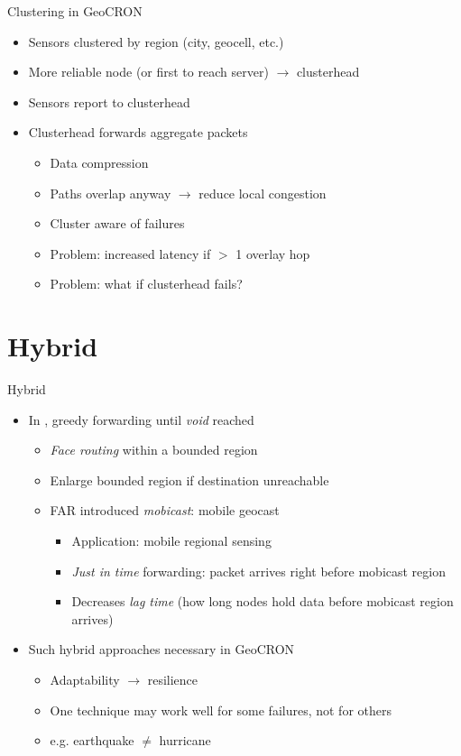 \documentclass[pdftex]{beamer}
\begin{document}
\begin{frame}{Clustering in GeoCRON}
	\begin{itemize}
	\item Sensors clustered by region (city, geocell, etc.)
	\item More reliable node (or first to reach server) $\rightarrow$ clusterhead
	\item Sensors report to clusterhead
	\item Clusterhead forwards aggregate packets
	\begin{itemize}
		\item Data compression
		\item Paths overlap anyway $\rightarrow$ reduce local congestion
		\item Cluster aware of failures
		\item<2-> \alert{Problem:} increased latency if $>$ 1 overlay hop
		\item<3-> \alert{Problem:} what if clusterhead fails?
	\end{itemize}
	\end{itemize}
\end{frame}


\section{Hybrid}

\begin{frame}{Hybrid}
\begin{itemize}
	\item In \cite{Kuhn2003, Huang2005, Karp2000}, greedy forwarding until \emph{void} reached
	\begin{itemize}
		\item \emph{Face routing} within a bounded region
		\item Enlarge bounded region if destination unreachable
		\item FAR \cite{Huang2005} introduced \emph{mobicast}: mobile geocast
		\begin{itemize}
			\item Application: mobile regional sensing
			\item \emph{Just in time} forwarding: packet arrives right before mobicast region
			\item Decreases \emph{lag time} (how long nodes hold data before mobicast region arrives)
		\end{itemize}
	\end{itemize}
	\item Such hybrid approaches necessary in GeoCRON
	\begin{itemize}
		\item Adaptability $\rightarrow$ resilience
		\item One technique may work well for some failures, not for others
		\item e.g. earthquake $\neq$ hurricane
	\end{itemize}
\end{itemize}
\end{frame}
\end{document}
